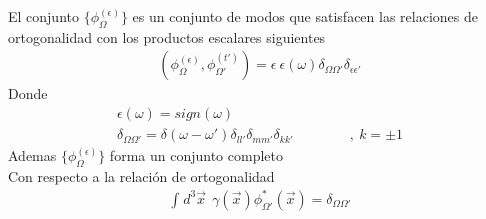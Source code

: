\documentclass{article}
\begin{document}
El conjunto $ \{\phi_\Omega ^ {(\epsilon)}\} $ es un conjunto de modos que satisfacen las relaciones de ortogonalidad con los productos escalares siguientes 
\begin{gather*}
  (\phi_\Omega ^ {(\epsilon)}, \phi_{\Omega'} ^ {(t')}) = \epsilon\ \epsilon (\omega) \delta _{\Omega \Omega' } \delta _{\epsilon\epsilon'}  
\end{gather*}
Donde 
\begin{gather*}
  \epsilon(\omega) = sign(\omega)  \\
  \delta _{\Omega \Omega'} = \delta(\omega-\omega' ) \delta _{ll'} \delta _{mm'} \delta _{kk'}   \qquad \qquad ,\ k = \pm 1  
\end{gather*}
Ademas $ \{\phi_\Omega ^ {(\epsilon)}\} $ forma un conjunto completo \\
Con respecto a la relación de ortogonalidad 
\begin{gather*}
  \displaystyle\int_{}^{}d^3 \vec x \ \ \gamma( \vec x) \phi _{\Omega' } ^* (\vec x ) = \delta _{\Omega \Omega '}  
\end{gather*}
\end{document}
